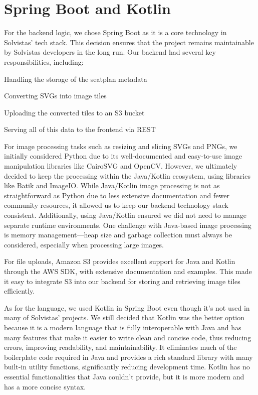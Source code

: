 \section{Spring Boot and Kotlin}
For the backend logic, we chose Spring Boot as it is a core technology in Solvistas’ tech stack. This decision ensures that the project remains maintainable by Solvistas developers in the long run. Our backend had several key responsibilities, including:
\begin{compactitem}
    \item Handling the storage of the seatplan metadata
    \item Converting SVGs into image tiles
    \item Uploading the converted tiles to an S3 bucket
    \item Serving all of this data to the frontend via REST
\end{compactitem}

For image processing tasks such as resizing and slicing SVGs and PNGs, we initially considered Python due to its well-documented and easy-to-use image manipulation libraries like CairoSVG and OpenCV. However, we ultimately decided to keep the processing within the Java/Kotlin ecosystem, using libraries like Batik and ImageIO. While Java/Kotlin image processing is not as straightforward as Python due to less extensive documentation and fewer community resources, it allowed us to keep our backend technology stack consistent. Additionally, using Java/Kotlin ensured we did not need to manage separate runtime environments. One challenge with Java-based image processing is memory management—heap size and garbage collection must always be considered, especially when processing large images.

For file uploads, Amazon S3 provides excellent support for Java and Kotlin through the AWS SDK, with extensive documentation and examples. This made it easy to integrate S3 into our backend for storing and retrieving image tiles efficiently.

As for the language, we used Kotlin in Spring Boot even though it’s not used in many of Solvistas’ projects. We still decided that Kotlin was the better option because it is a modern language that is fully interoperable with Java and has many features that make it easier to write clean and concise code, thus reducing errors, improving readability, and maintainability. It eliminates much of the boilerplate code required in Java and provides a rich standard library with many built-in utility functions, significantly reducing development time. Kotlin has no essential functionalities that Java couldn’t provide, but it is more modern and has a more concise syntax.

